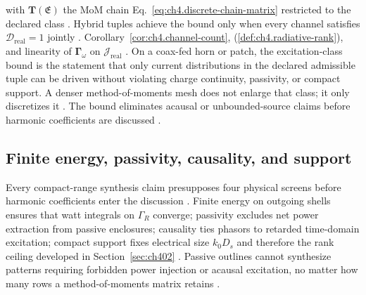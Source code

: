 with \(\mathbf{T}(\mathfrak{E})\) the MoM chain Eq.~\eqref{eq:ch4.discrete-chain-matrix} restricted to the declared class
. Hybrid tuples achieve the bound only when every channel satisfies
\(\mathcal{D}_{\mathrm{real}}=1\) jointly .
Corollary~\ref{cor:ch4.channel-count}, (\ref{def:ch4.radiative-rank}), and linearity of
\(\boldsymbol{\Gamma}_\omega\) on \(\mathcal{J}_{\mathrm{real}}\) .
On a coax-fed horn or patch, the excitation-class bound is the statement that only current distributions in the declared admissible tuple can be driven without violating charge continuity, passivity, or compact support. A denser method-of-moments mesh does not enlarge that class; it only discretizes it . The bound eliminates acausal or unbounded-source claims before harmonic coefficients are discussed .
\subsection{Finite energy, passivity, causality, and support}
\label{sec:ch412}
Every compact-range synthesis claim presupposes four physical screens before harmonic coefficients enter the discussion \cite{stratton1941}. Finite energy on outgoing shells ensures that watt integrals on $\Gamma_R$ converge; passivity excludes net power extraction from passive enclosures; causality ties phasors to retarded time-domain excitation; compact support fixes electrical size $k_0 D_s$ and therefore the rank ceiling developed in Section~\ref{sec:ch402} \cite{maxwell1873}. Passive outlines cannot synthesize patterns requiring forbidden power injection or acausal excitation, no matter how many rows a method-of-moments matrix retains \cite{harrington2001}.
